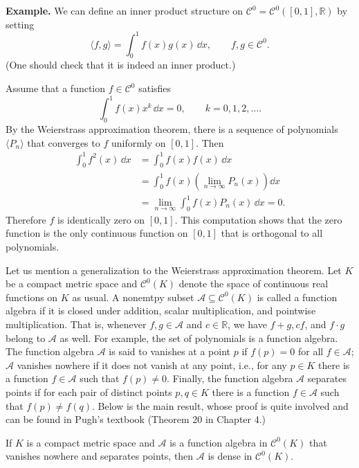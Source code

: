 \documentclass[11pt]{article}
\begin{document}
\noindent\textbf{Example.} We can define an inner product structure on $\mathcal{C}^0 = \mathcal{C}^0([0,1], \mathbb{R})$ by setting
\[
  \langle f, g \rangle = \int_0^1 f(x) g(x) \, \dd x, \qquad f, g \in \mathcal{C}^0.
\]
(One should check that it is indeed an inner product.)

Assume that a function $f \in \mathcal{C}^0$ satisfies
\[
  \int_0^1 f(x) x^k \, \dd x = 0, \qquad k = 0, 1, 2, \dots.
\]
By the Weierstrass approximation theorem, there is a sequence of polynomials $\langle P_n \rangle$ that converges to $f$ uniformly on $[0,1]$.
Then
\begin{align*}
  \int_0^1 f^2(x) \, \dd x &= \int_0^1 f(x) f(x) \, \dd x \\
  &= \int_0^1 f(x) \left( \lim_{n \to \infty} P_n(x) \right) \dd x \\
  &= \lim_{n \to \infty} \int_0^1 f(x) P_n(x) \, \dd x = 0.
\end{align*}
Therefore $f$ is identically zero on $[0,1]$.
This computation shows that the zero function is the only continuous function on $[0,1]$ that is orthogonal to all polynomials.

\medskip
Let us mention a generalization to the Weierstrass approximation theorem.
Let $K$ be a compact metric space and $\mathcal{C}^0(K)$ denote the space of continuous real functions on $K$ as usual.
A nonemtpy subset $\mathcal{A} \subseteq \mathcal{C}^0(K)$ is called a \textsf{function algebra} if it is closed under addition, scalar multiplication, and pointwise multiplication.
That is, whenever $f, g \in \mathcal{A}$ and $c \in \mathbb{R}$, we have $f+g, cf$, and $f \cdot g$ belong to $\mathcal{A}$ as well.
For example, the set of polynomials is a function algebra.
The function algebra $\mathcal{A}$ is said to \textsf{vanishes at a point} $p$ if $f(p) = 0$ for all $f \in \mathcal{A}$; $\mathcal{A}$ \textsf{vanishes nowhere} if it does not vanish at any point, i.e., for any $p \in K$ there is a function $f \in \mathcal{A}$ such that $f(p) \ne 0$.
Finally, the function algebra $\mathcal{A}$ \textsf{separates points} if for each pair of distinct points $p, q \in K$ there is a function $f \in \mathcal{A}$ such that $f(p) \ne f(q)$.
Below is the main result, whose proof is quite involved and can be found in Pugh's textbook (Theorem 20 in Chapter 4.)

\begin{thm}
  If $K$ is a compact metric space and $\mathcal{A}$ is a function algebra in $\mathcal{C}^0(K)$ that vanishes nowhere and separates points, then $\mathcal{A}$ is dense in $\mathcal{C}^0(K)$.
\end{thm}
\end{document}
